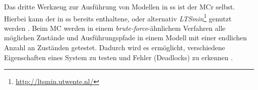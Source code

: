 Das dritte Werkzeug zur Ausführung von Modellen in \ac{ss} ist der \ac{MCr} selbst.
Hierbei kann der in \ac{ss} bereits enthaltene, oder alternativ \emph{LTSmin}\footnote{\url{http://ltsmin.utwente.nl/}} genutzt werden \cite{SSWikiModelChecking}.
Beim \ac{MC} werden in einem \emph{brute-force}-ähnlichem Verfahren alle möglichen Zustände und Ausführungspfade in einem Modell mit einer endlichen Anzahl an Zuständen getestet.
Dadurch wird es ermöglicht, verschiedene Eigenschaften eines System zu testen und Fehler (\zB Deadlocks) zu erkennen \cite{Grumberg1999}.
